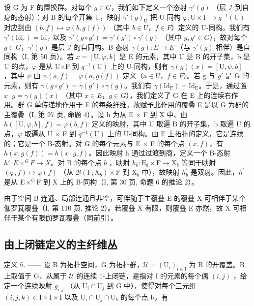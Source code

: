设 G 为 F 的置换群。对每个 \(g \in G\)，我们如下定义一个态射 \(\gamma'(g)\) （层 \(\mathcal{I}\) 到自身的态射）：对 B 的每个开集 U，映射 \(\gamma'(g)_{\mathrm{U}}\) 把 U-同构 \(\varphi: \mathrm{U} \times \mathrm{F} \to q^{-1}(\mathrm{U})\) 对应到由 \((b, f) \mapsto \varphi(b, g(f))\) （其中 \(b \in U\)，\(f \in F\)）定义的 U-同构。我们有 \(\gamma'(\mathrm{Id}_{\mathrm{F}}) = \mathrm{Id}_{\mathcal{I}}\) 以及 \(\gamma'(g \circ g') = \gamma'(g') \circ \gamma'(g)\) （其中 \(g, g' \in G\)），故对每个 \(g \in G\)，\(\gamma'(g)\) 是层 \(\mathcal{I}\) 的自同构。B-态射 \(\gamma(g): E \to E\) （与 \(\gamma'(g)\) 相伴）是自同构（I, 第 50 页）。若 \(x = [\mathrm{U}, \varphi, b]\) 是 E 的元素，其中 U 是 B 的开子集，b 是 U 的点，\(\varphi\) 是从 U×F 到 \(q^{-1}(\mathrm{U})\) 上的 U-同构，则有 \(\gamma(g)(x) = [\mathrm{U}, \psi, b]\) ，其中 \(\psi\) 由 \(\psi(a, f) = \varphi(a, g(f))\) 定义（\(a \in U\)，\(f \in F\)）。若 g 与 \(g'\) 是 G 的元素，则有 \(\gamma(g \circ g') = \gamma(g') \circ \gamma(g)\)。我们有 \(\gamma(\mathrm{Id}_{\mathrm{F}}) = \mathrm{Id}_{\mathrm{E}}\)。于是，通过置 \(x \cdot g = \gamma(g)(x)\) （其中 \(x \in E\)，\(g \in G\)），我们定义了 G 在 E 上的连续右作用。群 G 单传递地作用于 E 的每条纤维，故赋予此作用的覆叠 E 是以 G 为群的主覆叠（I, 第 97 页, 命题 4）。设 h 为从 E × F 到 X 中、由 \(h([\mathrm{U}, \varphi, b], f) = \varphi(b, f)\) 定义的映射，其中 U 取遍 B 的开子集，b 取遍 U 的点，\(\varphi\) 取遍从 U × F 到 \(q^{-1}(\mathrm{U})\) 上的 U-同构。由 E 上拓扑的定义，它是连续的；它是一个 B-态射。对 G 的每个元素与 E × F 的每个点 \((x, f)\)，有 \(h(x, g(f)) = h(x \cdot g, f)\)。因此映射 h 通过过渡到商，定义一个 B-态射 \(h': E \times^{G} F \to X\)。对 B 的每个点 \(b\) ，映射 \(h_b\colon \mathrm{E}_b\times \mathrm{F}\to \mathrm{X}_b\) 等同于映射 \((\varphi, f)\mapsto \varphi(f)\) （从 \(\mathcal{B}(\mathrm{F};\mathrm{X}_b)\times \mathrm{F}\) 到 \(\mathrm{X}_b\) 中），故映射 \(h_b^\prime\) 是双射。因此，\(h^\prime\) 是从 \(\mathrm{E}\times^{\mathrm{G}}\mathrm{F}\) 到 X 上的 B-同构（I, 第 30 页, 命题 6 的推论 2）。

由于空间 B 连通、局部连通且非空，可伴随于主覆叠 E 的覆叠 X 可相伴于某个伽罗瓦覆叠（I, 第 110 页, 推论 2）。若覆叠 X 有限，则覆叠 E 亦然，故 X 可相伴于某个有限伽罗瓦覆叠（同前引）。

\subsection{由上闭链定义的主纤维丛}

定义 6. —— 设 B 为拓扑空间，G 为拓扑群，\(\mathcal{U} = (\mathrm{U}_{i})_{i\in \mathrm{I}}\) 为 B 的开覆盖。B 上取值于 G、从属于 \(\mathcal{U}\) 的连续 1-上闭链，是指对 I 的元素的每个偶 \((i,j)\) ，给定一个连续映射 \(g_{i,j}\) （从 \(\mathrm{U}_i\cap \mathrm{U}_j\) 到 G 中），使得对每个三元组 \((i,j,k)\in \mathrm{I}\times \mathrm{I}\times \mathrm{I}\) 以及 \(\mathrm{U}_i\cap \mathrm{U}_j\cap \mathrm{U}_k\) 的每个点 b，有

